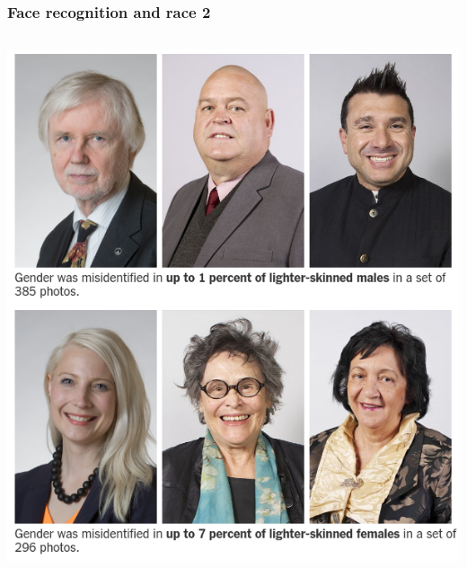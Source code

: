\documentclass{beamer}
\begin{document}
\begin{frame}
\frametitle{Face recognition and race 2}
\begin{columns}
    \begin{column}{0.4\textwidth}
        \includegraphics[width=1\textwidth]{./images/gender_race_1.png}
    \end{column}
    

\end{columns}
\end{frame}
\end{document}
